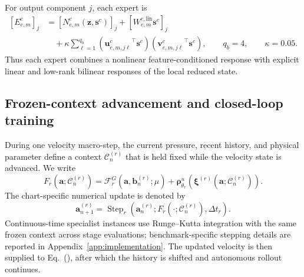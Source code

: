 For output component $j$, each expert is
\begin{align}
  \left[E_{e,m}^c\right]_j
  &=
  \left[
    N_{e,m}^c
    \left(
      \bm z,\bm s^c
    \right)
  \right]_j
  +
  \left[
    W_{e,m}^{c,\mathrm{lin}}
    \bm s^c
  \right]_j
  \nonumber\\
  &\quad+
  \kappa
  \sum_{\ell=1}^{q_b}
  \left(
    {\bm u_{e,m,j\ell}^c}^{\top}
    \bm s^c
  \right)
  \left(
    {\bm v_{e,m,j\ell}^c}^{\top}
    \bm s^c
  \right),
  \qquad
  q_b=4,
  \qquad
  \kappa=0.05.
  \label{eq:app_structured_expert}
\end{align}
Thus each expert combines a nonlinear feature-conditioned response with
explicit linear and low-rank bilinear responses of the local reduced state.


\subsection{Frozen-context advancement and closed-loop training}

During one velocity macro-step, the current pressure, recent history, and
physical parameter define a context $\mathcal C_n^{(r)}$ that is held fixed
while the velocity state is advanced. We write
\begin{equation}
  F_r
  \left(
    \bm a;\mathcal C_n^{(r)}
  \right)
  =
  \mathcal F_r^G
  \left(
    \bm a,\bm b_n^{(r)};\mu
  \right)
  +
  \bm\rho^u_{\theta_r}
  \left(
    \bm\xi^{(r)}
    \left(
      \bm a;\mathcal C_n^{(r)}
    \right)
  \right).
  \label{eq:app_frozen_context_rhs}
\end{equation}
The chart-specific numerical update is denoted by
\begin{equation}
  \bm a_{n+1}^{(r)}
  =
  \operatorname{Step}_r
  \left(
    \bm a_n^{(r)};
    F_r(\cdot;\mathcal C_n^{(r)}),
    \Delta t_r
  \right).
  \label{eq:app_specialist_step}
\end{equation}
Continuous-time specialist instances use Runge--Kutta integration with the
same frozen context across stage evaluations; benchmark-specific stepping
details are reported in Appendix~\ref{app:implementation}.
The updated velocity is then supplied to
Eq.~(), after which the history is
shifted and autonomous rollout continues.

